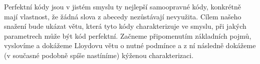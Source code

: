 \documentclass[a4paper,12pt,titlepage]{article}
\begin{document}
Perfektní kódy jsou v jistém smyslu ty nejlepší samoopravné kódy, konkrétně mají vlastnost, že žádná slova z abecedy nezůstávají nevyužita. Cílem našeho snažení bude ukázat větu, která tyto kódy charakterizuje ve smyslu, při jakých parametrech může být kód perfektní. Začneme připomenutím základních pojmů, vyslovíme a dokážeme Lloydovu větu o nutné podmínce a z ní následně dokážeme (v současné podobně spíše nastíníme) kýženou charakterizaci.

\medskip







\end{document}
